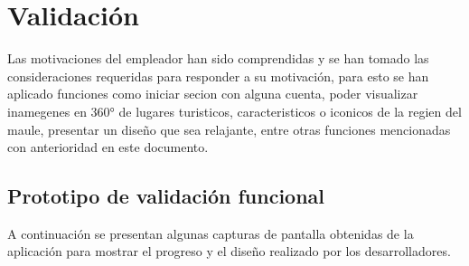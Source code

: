 \section{Validación}
 Las motivaciones del empleador han sido comprendidas y se han tomado las consideraciones requeridas para responder a su motivación, para esto se han aplicado funciones como iniciar secion con alguna cuenta, poder visualizar inamegenes en 360° de lugares turisticos, caracteristicos o iconicos de la regien del maule, presentar un diseño que sea relajante, entre otras funciones mencionadas con anterioridad en este documento.
\subsection{Prototipo de validación funcional}
A continuación se presentan algunas capturas de pantalla obtenidas de la aplicación para mostrar el progreso y el diseño realizado por los desarrolladores.
